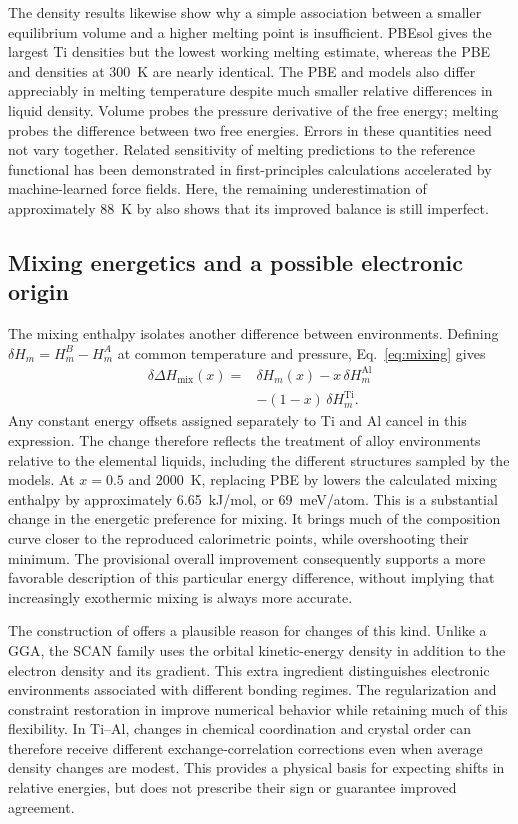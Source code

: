 The density results likewise show why a simple association between a smaller equilibrium volume and a higher melting point is insufficient.
PBEsol gives the largest Ti densities but the lowest working melting estimate, whereas the PBE and \rscan{} densities at 300~K are nearly identical. The PBE and \rscan{} models also differ appreciably in melting temperature despite much smaller relative differences in liquid density.
Volume probes the pressure derivative of the free energy; melting probes the difference between two free energies.
Errors in these quantities need not vary together.
Related sensitivity of melting predictions to the reference functional has been demonstrated in first-principles calculations accelerated by machine-learned force fields.\cite{Jinnouchi2019}
Here, the remaining underestimation of approximately 88~K by \rscan{} also shows that its improved balance is still imperfect.

\subsection{Mixing energetics and a possible electronic origin}

The mixing enthalpy isolates another difference between environments.
Defining $\delta H_m=H_m^B-H_m^A$ at common temperature and pressure, Eq.~\eqref{eq:mixing} gives
\begin{align}
 \delta\Delta H_{\mathrm{mix}}(x)={}&\delta H_m(x)
 -x\,\delta H_m^{\mathrm{Al}}\nonumber\\
 &-(1-x)\,\delta H_m^{\mathrm{Ti}}.
 \label{eq:mixing_shift}
\end{align}
Any constant energy offsets assigned separately to Ti and Al cancel in this expression.
The change therefore reflects the treatment of alloy environments relative to the elemental liquids, including the different structures sampled by the models.
At $x=0.5$ and 2000~K, replacing PBE by \rscan{} lowers the calculated mixing enthalpy by approximately 6.65~kJ/mol, or 69~meV/atom.
This is a substantial change in the energetic preference for mixing.
It brings much of the composition curve closer to the reproduced calorimetric points, while overshooting their minimum.
The provisional overall improvement consequently supports a more favorable description of this particular energy difference, without implying that increasingly exothermic mixing is always more accurate.

The construction of \rscan{} offers a plausible reason for changes of this kind.
Unlike a GGA, the SCAN family uses the orbital kinetic-energy density in addition to the electron density and its gradient.
This extra ingredient distinguishes electronic environments associated with different bonding regimes.\cite{Sun2015}
The regularization and constraint restoration in \rscan{} improve numerical behavior while retaining much of this flexibility.\cite{Furness2020}
In Ti--Al, changes in chemical coordination and crystal order can therefore receive different exchange-correlation corrections even when average density changes are modest.
This provides a physical basis for expecting shifts in relative energies, but does not prescribe their sign or guarantee improved agreement.

